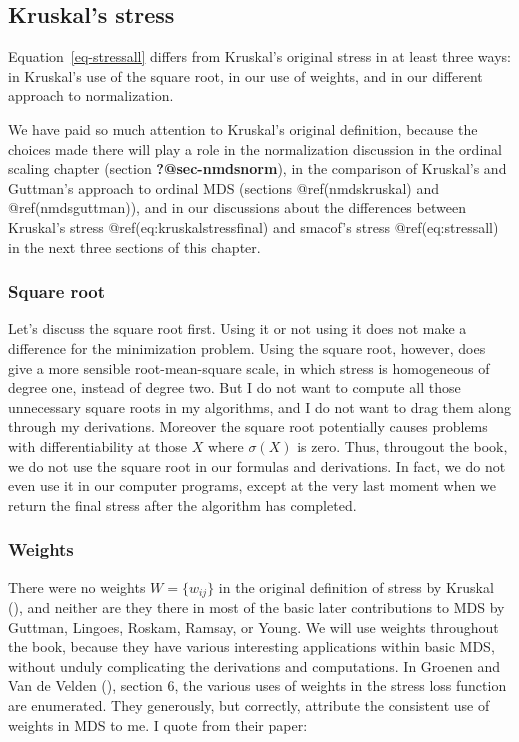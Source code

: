 \documentclass[
  12pt,
  letterpaper,
  DIV=11,
  numbers=noendperiod]{scrreprt}
\theoremstyle{remark}
\begin{document}
\subsection{Kruskal's stress}\label{kruskals-stress}

Equation~\ref{eq-stressall} differs from Kruskal's original stress in at
least three ways: in Kruskal's use of the square root, in our use of
weights, and in our different approach to normalization.

We have paid so much attention to Kruskal's original definition, because
the choices made there will play a role in the normalization discussion
in the ordinal scaling chapter (section \textbf{?@sec-nmdsnorm}), in the
comparison of Kruskal's and Guttman's approach to ordinal MDS (sections
@ref(nmdskruskal) and @ref(nmdsguttman)), and in our discussions about
the differences between Kruskal's stress @ref(eq:kruskalstressfinal) and
smacof's stress @ref(eq:stressall) in the next three sections of this
chapter.

\subsubsection{Square root}\label{square-root}

Let's discuss the square root first. Using it or not using it does not
make a difference for the minimization problem. Using the square root,
however, does give a more sensible root-mean-square scale, in which
stress is homogeneous of degree one, instead of degree two. But I do not
want to compute all those unnecessary square roots in my algorithms, and
I do not want to drag them along through my derivations. Moreover the
square root potentially causes problems with differentiability at those
\(X\) where \(\sigma(X)\) is zero. Thus, througout the book, we do not
use the square root in our formulas and derivations. In fact, we do not
even use it in our computer programs, except at the very last moment
when we return the final stress after the algorithm has completed.

\subsubsection{Weights}\label{bweights}

There were no weights \(W=\{w_{ij}\}\) in the original definition of
stress by Kruskal (), and neither are
they there in most of the basic later contributions to MDS by Guttman,
Lingoes, Roskam, Ramsay, or Young. We will use weights throughout the
book, because they have various interesting applications within basic
MDS, without unduly complicating the derivations and computations. In
Groenen and Van de Velden (),
section 6, the various uses of weights in the stress loss function are
enumerated. They generously, but correctly, attribute the consistent use
of weights in MDS to me. I quote from their paper:
\end{document}
